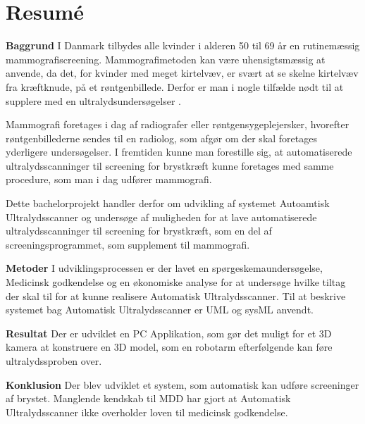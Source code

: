\chapter{Resumé}
\textbf{Baggrund}
I Danmark tilbydes alle kvinder i alderen 50 til 69 år en rutinemæssig mammografiscreening. Mammografimetoden kan være uhensigtsmæssig at anvende, da det, for kvinder med meget kirtelvæv, er svært at se skelne kirtelvæv fra kræftknude, på et røntgenbillede. Derfor er man i nogle tilfælde nødt til at supplere med en ultralydsundersøgelser \cite{Ultralyd}.

Mammografi foretages i dag af radiografer eller røntgensygeplejersker, hvorefter røntgenbillederne sendes til en radiolog, som afgør om der skal foretages yderligere undersøgelser. I fremtiden kunne man forestille sig, at automatiserede ultralydsscanninger til screening for brystkræft kunne foretages med samme procedure, som man i dag udfører mammografi.

Dette bachelorprojekt handler derfor om udvikling af systemet Autoamtisk Ultralydsscanner og undersøge af muligheden for at lave automatiserede ultralydsscanninger til screening for brystkræft, som en del af screeningsprogrammet, som supplement til mammografi.

\textbf{Metoder}
I udviklingsprocessen er der lavet en spørgeskemaundersøgelse, Medicinsk godkendelse og en økonomiske analyse for at undersøge hvilke tiltag der skal til for at kunne realisere Automatisk Ultralydsscanner. Til at beskrive systemet bag Automatisk Ultralydsscanner er UML og sysML anvendt. 

\textbf{Resultat}
Der er udviklet en PC Applikation, som gør det muligt for et 3D kamera at konstruere en 3D model, som en robotarm efterfølgende kan føre ultralydssproben over. 

\textbf{Konklusion}
Der blev udviklet et system, som automatisk kan udføre screeninger af brystet. Manglende kendskab til MDD har gjort at Automatisk Ultralydsscanner ikke overholder loven til medicinsk godkendelse. 